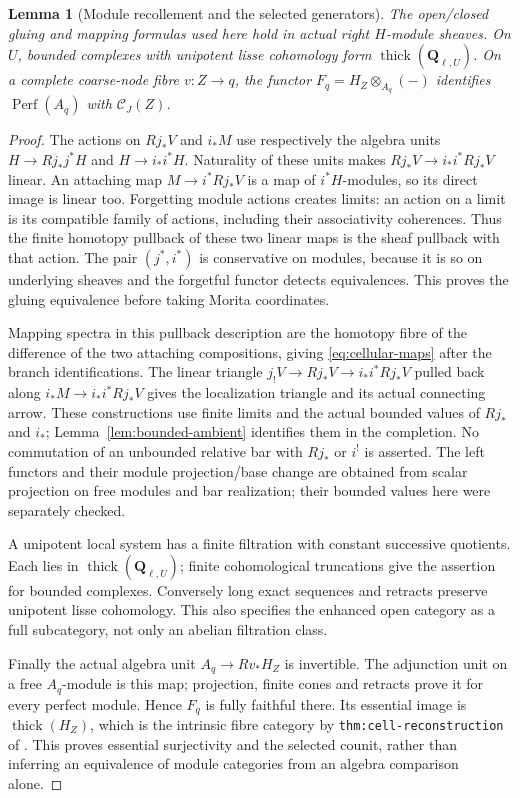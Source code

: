 \documentclass[11pt]{article}
\newtheorem{lemma}[proposition]{Lemma}
\theoremstyle{definition}
\theoremstyle{remark}
\newcommand{\Perf}{\operatorname{Perf}}
\begin{document}
\begin{lemma}[Module recollement and the selected generators]
\label{lem:module-recollement}
The open/closed gluing and mapping formulas used here hold in actual
right $H$-module sheaves.  On $U$, bounded complexes with unipotent
lisse cohomology form $\operatorname{thick}(\mathbf Q_{\ell,U})$.  On a complete
coarse-node fibre $v:Z\to q$, the functor
$F_q=H_Z\otimes_{A_q}(-)$ identifies $\Perf(A_q)$ with
$\mathcal C_J(Z)$.
\end{lemma}
\begin{proof}
The actions on $Rj_*V$ and $i_*M$ use respectively the algebra units
$H\to Rj_*j^*H$ and $H\to i_*i^*H$.  Naturality of these units
makes $Rj_*V\to i_*i^*Rj_*V$ linear.  An attaching map
$M\to i^*Rj_*V$ is a map of $i^*H$-modules, so its direct image
is linear too.  Forgetting module actions creates limits: an action
on a limit is its compatible family of actions, including their
associativity coherences.  Thus the finite homotopy pullback of
these two linear maps is the sheaf pullback with that action.
The pair $(j^*,i^*)$ is conservative on modules, because it is so
on underlying sheaves and the forgetful functor detects equivalences.
This proves the gluing equivalence before taking Morita coordinates.

Mapping spectra in this pullback description are the homotopy fibre
of the difference of the two attaching compositions, giving
\eqref{eq:cellular-maps} after the branch identifications.
The linear triangle $j_!V\to Rj_*V\to i_*i^*Rj_*V$ pulled back
along $i_*M\to i_*i^*Rj_*V$ gives the localization triangle and
its actual connecting arrow.  These constructions use finite
limits and the actual bounded values of $Rj_*$ and $i_*$;
Lemma~\ref{lem:bounded-ambient} identifies them in the completion.
No commutation of an unbounded relative bar with $Rj_*$ or $i^!$
is asserted.  The left functors and their module projection/base
change are obtained from scalar projection on free modules and
bar realization; their bounded values here were separately checked.

A unipotent local system has a finite filtration with constant
successive quotients.  Each lies in $\operatorname{thick}(\mathbf Q_{\ell,U})$;
finite cohomological truncations give the assertion for bounded
complexes.  Conversely long exact sequences and retracts preserve
unipotent lisse cohomology.  This also specifies the enhanced open
category as a full subcategory, not only an abelian filtration class.

Finally the actual algebra unit $A_q\to Rv_*H_Z$ is invertible.
The adjunction unit on a free $A_q$-module is this map; projection,
finite cones and retracts prove it for every perfect module.
Hence $F_q$ is fully faithful there.  Its essential image is
$\operatorname{thick}(H_Z)$, which is the intrinsic fibre category
by \texttt{thm:cell-reconstruction} of \cite{Refinement}.
This proves essential surjectivity and the selected counit, rather
than inferring an equivalence of module categories from an algebra
comparison alone.
\end{proof}
\end{document}
